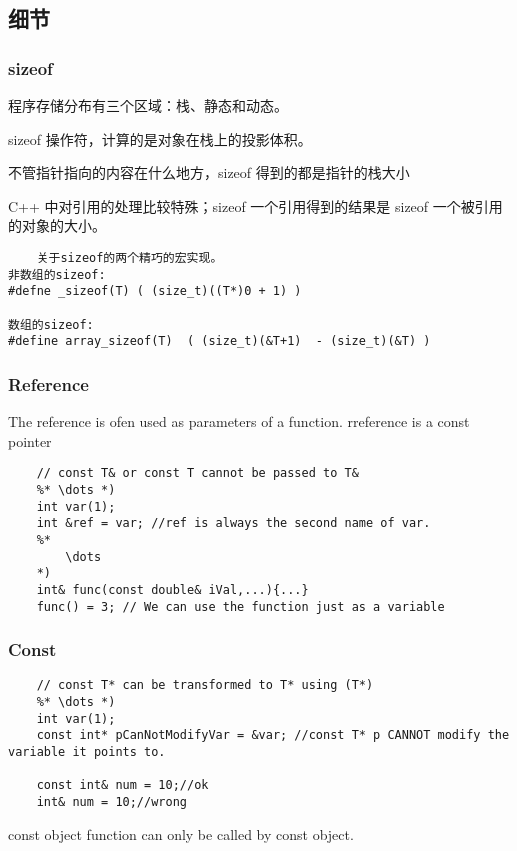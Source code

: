 \documentclass[UTF8]{../computerUniverse}
\begin{document}
\subsection{细节}

\subsubsection{sizeof}

程序存储分布有三个区域：栈、静态和动态。

sizeof 操作符，计算的是对象在栈上的投影体积。

不管指针指向的内容在什么地方，sizeof 得到的都是指针的栈大小

C++ 中对引用的处理比较特殊；sizeof 一个引用得到的结果是 sizeof 一个被引用的对象的大小。



\begin{lstlisting}
    关于sizeof的两个精巧的宏实现。
非数组的sizeof:
#defne _sizeof(T) ( (size_t)((T*)0 + 1) )

数组的sizeof:
#define array_sizeof(T)  ( (size_t)(&T+1)  - (size_t)(&T) )
\end{lstlisting}


\subsubsection{Reference}
The reference is ofen used as parameters of a function. 
rreference is a const pointer

\begin{lstlisting}
    // const T& or const T cannot be passed to T&
    %* \dots *)
    int var(1);
    int &ref = var; //ref is always the second name of var.
    %*
        \dots
    *)
    int& func(const double& iVal,...){...}
    func() = 3; // We can use the function just as a variable
\end{lstlisting}

 
\subsubsection{Const}

\begin{lstlisting}
    // const T* can be transformed to T* using (T*)
    %* \dots *)
    int var(1);
    const int* pCanNotModifyVar = &var; //const T* p CANNOT modify the variable it points to.

    const int& num = 10;//ok
    int& num = 10;//wrong
\end{lstlisting}
const object function can only be called by const object.\\
\end{document}
